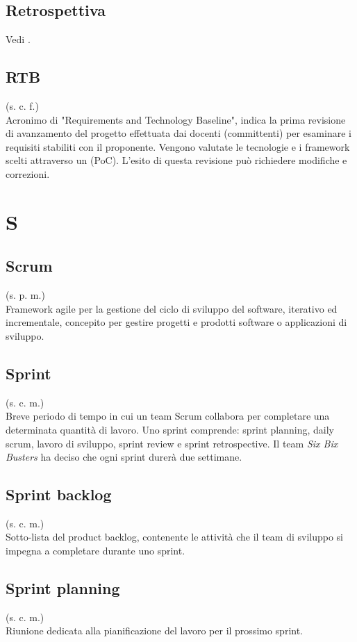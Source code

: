     \subsection{Retrospettiva}
    Vedi .
    \subsection{RTB}
    \label{RTB}
    (s. c. f.)\\
    Acronimo di "Requirements and Technology Baseline", indica la prima revisione di avanzamento del progetto effettuata dai docenti (committenti) per esaminare i requisiti stabiliti con il proponente. Vengono valutate le tecnologie e i framework scelti attraverso un  (PoC). L'esito di questa revisione può richiedere modifiche e correzioni.
\pagebreak
\section{S}
    \subsection{Scrum}
    (s. p. m.)\\
    Framework agile per la gestione del ciclo di sviluppo del software, 
    iterativo ed incrementale, concepito per gestire progetti e prodotti software 
    o applicazioni di sviluppo.
    \subsection{Sprint}
    \label{Sprint}
    (s. c. m.)\\
    Breve periodo di tempo in cui un team Scrum collabora per completare 
    una determinata quantità di lavoro. Uno sprint comprende:  
    sprint planning, daily scrum, lavoro di sviluppo, 
    sprint review e sprint retrospective. Il team \textit{Six Bix Busters} ha 
    deciso che ogni sprint durerà due settimane.
    \subsection{Sprint backlog}   
    \label{Sprint backlog}
    (s. c. m.)\\
    Sotto-lista del product backlog, contenente le attività che il team di sviluppo 
    si impegna a completare durante uno sprint.
    \subsection{Sprint planning}
    (s. c. m.)\\
    Riunione dedicata alla pianificazione del lavoro per il prossimo sprint. 
